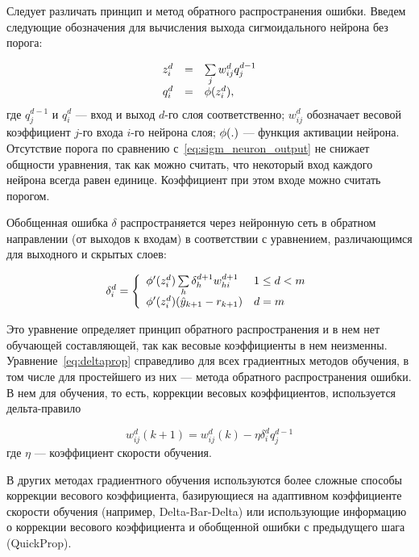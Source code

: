 Следует различать принцип и метод обратного распространения ошибки.
Введем следующие обозначения для вычисления выхода сигмоидального
нейрона без порога:

\begin{equation}
\label{eq:sigm_neuron_output_parts}
\begin{array}{rcl}
  z^d_i & = & \sum\limits_j w^d_{ij}q^{d-1}_j \\
  q^d_i & = & \fa(z^d_i),
\end{array}
\end{equation} где $q^{d-1}_j$ и $q^d_i$ --- вход и выход $d$-го слоя
соответственно; $w^d_{ij}$ обозначает весовой коэффициент $j$-го входа
$i$-го нейрона слоя; $\phi(.)$ --- функция активации нейрона.
Отсутствие порога по сравнению с~\eqref{eq:sigm_neuron_output} не
снижает общности уравнения, так как можно считать, что некоторый вход
каждого нейрона всегда равен единице.  Коэффициент при этом входе
можно считать порогом.

Обобщенная ошибка $\delta$ распространяется через нейронную сеть в
обратном направлении (от выходов к входам) в соответствии с
уравнением, различающимся для выходного и скрытых слоев:

\begin{equation}
\label{eq:deltaprop}
  \delta^d_i=\left\{\begin{array}{ll}
    \fa'(z^d_i)\sum\limits_h\delta^{d+1}_h w^{d+1}_{hi} & 1\le d<m \\
    \fa'(z^d_i)(\hat{y}_{k+1}-r_{k+1}) & d=m \\
  \end{array}\right.
\end{equation}

Это уравнение определяет принцип обратного распространения и в нем нет
обучающей составляющей, так как весовые коэффициенты в нем неизменны.
Уравнение~\eqref{eq:deltaprop} справедливо для всех градиентных
методов обучения, в том числе для простейшего из них --- метода
обратного распространения ошибки.  В нем для обучения, то есть,
коррекции весовых коэффициентов, используется дельта-правило

\begin{equation}
\label{eq:weightchange}
  w^d_{ij}(k+1)=w^d_{ij}(k)-\eta\delta^d_i q^{d-1}_j
\end{equation} где $\eta$ --- коэффициент скорости обучения.

В других методах градиентного обучения используются более сложные
способы коррекции весового коэффициента, базирующиеся на адаптивном
коэффициенте скорости обучения (например, Delta-Bar-Delta) или
использующие информацию о коррекции весового коэффициента и обобщенной
ошибки с предыдущего шага (QuickProp).

